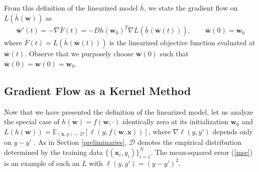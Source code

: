 \documentclass{article}
\begin{document}
From this definition of the linearized model $\bar{h}$, we state the gradient flow on $L(\bar{h}(\boldsymbol{w}))$ as 
\begin{align*}
    \boldsymbol{\bar{w}}'(t) = -\nabla \bar{F}(t) = - Dh(\boldsymbol{w}_0)^T \nabla L(\bar{h}(\boldsymbol{\bar{w}}(t))), \qquad \boldsymbol{\bar{w}}(0) = \boldsymbol{w}_0
\end{align*}
where $\bar{F}(t) = L(\bar{h}(\boldsymbol{\bar{w}}(t)))$ is the linearized objective function evaluated at $\boldsymbol{\bar{w}}(t)$. Observe that we purposely choose $\boldsymbol{\bar{w}}(0)$ such that $\boldsymbol{\bar{w}}(0) = \boldsymbol{w}(0) = \boldsymbol{w}_0$.

\subsection{Gradient Flow as a Kernel Method}\label{kernelmethod}

Now that we have presented the definition of the linearized model, let us analyze the special case of $h(\boldsymbol{w}) = f(\boldsymbol{w}, \cdot)$ identically zero at its initialization $\boldsymbol{w}_0$ and $L(h(\boldsymbol{w})) = \mathbb{E}_{(\boldsymbol{x}, y) \sim \mathcal{D}} [\ell(y, f(\boldsymbol{w}, \boldsymbol{x}))]$, where $\nabla \ell(y, y')$ depends only on $y - y'$ \cite{chizat2018note}. As in Section \ref{preliminaries}, $\mathcal{D}$ denotes the empirical distribution determined by the training data $\{ (\boldsymbol{x}_i, y_i) \}_{i=1}^N$. The mean-squared error (\ref{mse}) is an example of such an $L$ with $\ell(y, y') = (y - y')^2$. 
\end{document}
